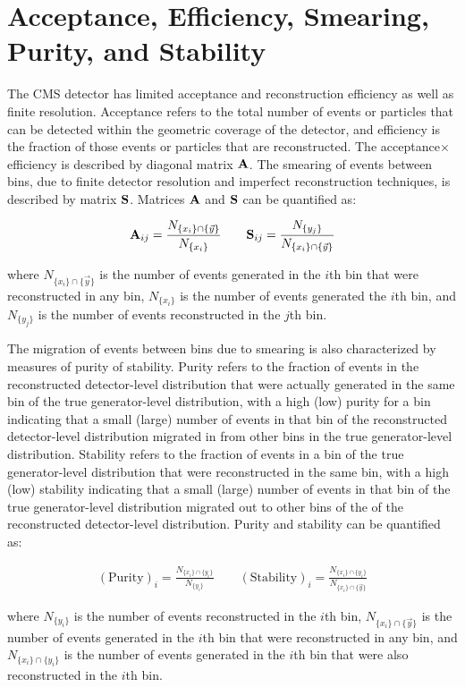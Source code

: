 \section{Acceptance, Efficiency, Smearing, Purity, and Stability}
The CMS detector has limited acceptance and reconstruction efficiency as well as finite resolution.
Acceptance refers to the total number of events or particles that can be detected within the geometric coverage of the detector, and efficiency is the fraction of those events or particles that are reconstructed.
The acceptance$\times$efficiency is described by diagonal matrix $\mathbf{A}$. 
The smearing of events between bins, due to finite detector resolution and imperfect reconstruction techniques, is described by matrix $\mathbf{S}$.
Matrices $\mathbf{A}$ and $\mathbf{S}$ can be quantified as:
\begin{linenomath*}
\begin{align}
\mathbf{A}_{ij} = \frac{N_{ \{ x_i \} \cap \{ \vec{y} \}}}{N_{ \{ x_i \} }} \quad \quad
\mathbf{S}_{ij} = \frac{N_{ \{ y_j \} }}{N_{ \{ x_i \} \cap \{ \vec{y} \}}}
\end{align}
\end{linenomath*}
where $N_{ \{ x_i \} \cap \{ \vec{y} \}}$ is the number of events generated in the $i$th bin that were reconstructed in any bin, $N_{ \{ x_i \} }$ is the number of events generated the $i$th bin, and $N_{ \{ y_j \} }$ is the number of events reconstructed in the $j$th bin.

The migration of events between bins due to smearing is also characterized by measures of purity of stability.
Purity refers to the fraction of events in the reconstructed detector-level distribution that were actually generated in the same bin of the true generator-level distribution, with a high (low) purity for a bin indicating that a small (large) number of events in that bin of the reconstructed detector-level distribution migrated in from other bins in the true generator-level distribution.
Stability refers to the fraction of events in a bin of the true generator-level distribution that were reconstructed in the same bin, with a high (low) stability indicating that a small (large) number of events in that bin of the true generator-level distribution migrated out to other bins of the of the reconstructed detector-level distribution.
Purity and stability can be quantified as:
\begin{linenomath*}
\begin{align}
(\text{Purity})_i = \frac{N_{ \{ x_i \} \cap \{ y_i \} }}{N_{ \{ y_i \} }} \quad \quad
(\text{Stability})_i = \frac{N_{ \{ x_i \} \cap \{ y_i \} }}{N_{ \{ x_i \} \cap \{ \vec{y} \}}}
\end{align}
\end{linenomath*}
where $N_{ \{ y_i \} }$ is the number of events reconstructed in the $i$th bin, $N_{ \{ x_i \} \cap \{ \vec{y} \}}$ is the number of events generated in the $i$th bin that were reconstructed in any bin, and $N_{ \{ x_i \} \cap \{ y_i \} }$ is the number of events generated in the $i$th bin that were also reconstructed in the $i$th bin.

